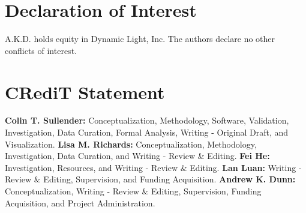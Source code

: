 \documentclass[review]{elsarticle}
\begin{document}
\section*{Declaration of Interest}
A.K.D. holds equity in Dynamic Light, Inc. The authors declare no other conflicts of interest.

\section*{CRediT Statement}
\textbf{Colin T. Sullender:} Conceptualization, Methodology, Software, Validation, Investigation, Data Curation, Formal Analysis, Writing - Original Draft, and Visualization. \textbf{Lisa M. Richards:} Conceptualization, Methodology, Investigation, Data Curation, and Writing - Review \& Editing. \textbf{Fei He:} Investigation, Resources, and Writing - Review \& Editing. \textbf{Lan Luan:} Writing - Review \& Editing, Supervision, and Funding Acquisition. \textbf{Andrew K. Dunn:} Conceptualization, Writing - Review \& Editing, Supervision, Funding Acquisition, and Project Administration.





\end{document}
